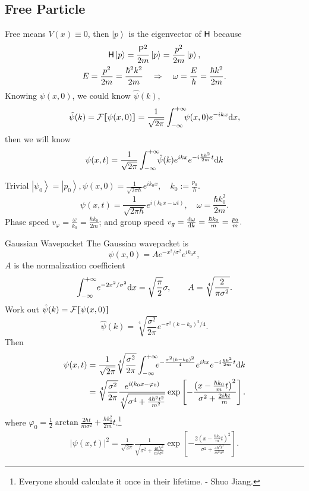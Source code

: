 \documentclass{article}
\def\d{{\rm d}}
\newcommand{\ko}[1]{\hspace{-#1 pt}}%
\newcommand{\ds}[2]{\frac{\d #1}{\d #2}}%
\newcommand{\ket}[1]{\left\vert #1\right\rangle}
\newcommand{\cmm}[1]{\lfloor\ko{4.45}\lceil #1\rceil\ko{4.45}\rfloor}%
\begin{document}
\subsection{Free Particle}
Free means $V(x)\equiv 0$, then $\ket p$ is the eigenvector of $\mathsf H$ because
\begin{gather*}
	\sH\ket p=\frac{\sP^2}{2m}\ket p=\frac{p^2}{2m}\ket p,\\
	E=\frac{p^2}{2m}=\frac{\hbar^2k^2}{2m}\quad\Rightarrow\quad\omega=\frac E\hbar=\frac{\hbar k^2}{2m}.
\end{gather*}
Knowing $\psi(x,0)$, we could know $\hat\psi(k)$,
$$\hat\psi(k)=\mathcal F\cmm{\psi(x,0)}=\frac1{\sqrt{2\pi}}\int_{-\infty}^{+\infty}\ko5\psi(x,0)e^{-ikx}\d x,$$
then we will know
$$\psi(x,t)=\frac1{\sqrt{2\pi}}\int_{-\infty}^{+\infty}\ko5\hat\psi(k)e^{ikx}e^{-i\frac{\hbar k^2}{2m}t}\d k$$
\begin{example}{Trivial}{}
	$\ket{\psi_0}=\ket{p_0},\psi(x,0)=\frac1{\sqrt{2\pi\hbar}}e^{ik_0x},\quad k_0:=\frac{p_0}\hbar$.
	$$\psi(x,t)=\frac1{\sqrt{2\pi\hbar}}e^{i(k_0x-\omega t)},\quad\omega=\frac{\hbar k^2_0}{2m}.$$
	Phase speed $v_\varphi=\frac\omega{k_0}=\frac{\hbar k_0}{2m}$; and group speed $v_g=\ds\omega{k}=\frac{\hbar k_0}m=\frac{p_0}m.$
\end{example}
\begin{example}{Gaussian Wavepacket}{}
	The Gaussian wavepacket is 
	$$\psi(x,0)=Ae^{-x^2/\sigma^2}e^{ik_0x},$$
	$A$ is the normalization coefficient
	$$\int_{-\infty}^{+\infty}\ko2e^{-2x^2/\sigma^2}\d x=\sqrt{\frac{\pi}2}\sigma,\qquad A=\sqrt[4]{\frac2{\pi\sigma^2}}.$$%
	Work out $\hat\psi(k)=\mathcal F\cmm{\psi(x,0)}$
	$$\hat\psi(k)=\sqrt[4]{\frac{\sigma^2}{2\pi}}e^{-\sigma^2(k-k_0)^2/4}.$$%
	Then
	\begin{align*}
		\psi(x,t) & =\frac1{\sqrt{2\pi}}\sqrt[4]{\frac{\sigma^2}{2\pi}}\int_{-\infty}^{+\infty}\ko5e^{-\frac{\sigma^2(k-k_0)^2}4}e^{ikx}e^{-i\frac{\hbar k^2}{2m}t}\d k                                               \\
		          & =\sqrt[4]{\frac{\sigma^2}{2\pi}}\frac{e^{i(k_0x-\varphi_0)}}{\sqrt[4]{\sigma^4+\frac{4\hbar^2t^2}{m^2}}}\exp\left[-\frac{\left(x-\frac{\hbar k_0}mt\right)^2}{\sigma^2+\frac{2i\hbar t}m}\right].
	\end{align*}
	where $\varphi_0=\frac12\arctan\frac{2\hbar t}{m\sigma^2}+\frac{\hbar k_0^2}{2m}t$.\footnote{Everyone should calculate it once in their lifetime. - Shuo Jiang.}
	\begin{align*}
		|\psi(x,t)|^2=\frac1{\sqrt{2\pi}}\frac1{\sqrt{\sigma^2+\frac{4\hbar^2t^2}{m^2\sigma^2}}}\exp\left[-\frac{2\left(x-\frac{\hbar k_0}mt\right)^2}{\sigma^2+\frac{4\hbar^2t^2}{m^2\sigma^2}}\right].
	\end{align*}

\end{example}
\end{document}
